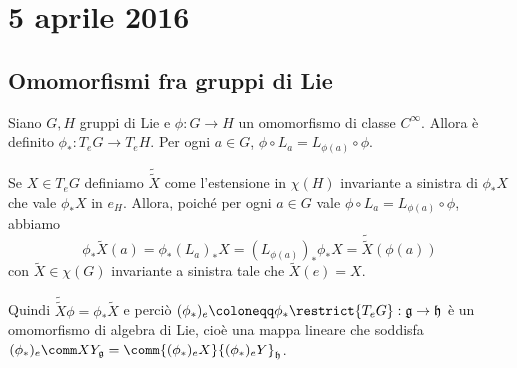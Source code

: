 \chapter{5 aprile 2016}

\section{Omomorfismi fra gruppi di Lie}

Siano $G,H$ gruppi di Lie e $\phi : G\to H$ un omomorfismo di classe $C^\infty$.
Allora è definito $\phi_* : T_eG \to T_eH$.
Per ogni $a \in G$, $\phi \circ L_a = L_{\phi(a)} \circ \phi$.

Se $X \in T_eG$ definiamo $\tilde{\tilde X}$ come l'estensione in $\chi(H)$ invariante a sinistra di $\phi_*X $ che vale $\phi_*X$ in $e_H$.
Allora, poiché per ogni $a \in G$ vale $\phi \circ L_a = L_{\phi(a)} \circ \phi$, abbiamo 
\begin{equation*}
\phi_* \tilde X(a) = \phi_* (L_a)_*X = (L_{\phi(a)})_* \phi_*X = \tilde{\tilde X} (\phi(a))
\end{equation*}
con $\tilde X\in\chi(G)$ invariante a sinistra tale che $\tilde X(e) = X$.

Quindi $\tilde{\tilde X} \phi = \phi_*\tilde X$ e perciò $(\phi_*)_e\coloneqq \phi_*\restrict{T_eG}:\mathfrak g \to \mathfrak h$ è un omomorfismo di algebra di Lie, cioè una mappa lineare che soddisfa $(\phi_*)_e \comm XY _{\mathfrak g} = \comm{ (\phi_*)_eX}{ (\phi_*)_eY }_{\mathfrak h}$.

